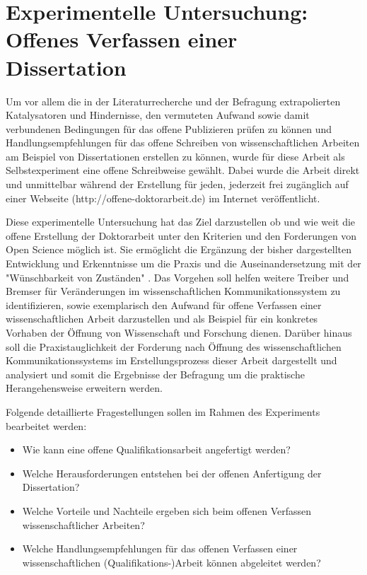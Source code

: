 \chapter{Experimentelle Untersuchung: Offenes Verfassen einer Dissertation}

Um vor allem die in der Literaturrecherche und der Befragung extrapolierten Katalysatoren und Hindernisse, den vermuteten Aufwand sowie damit verbundenen Bedingungen für das offene Publizieren prüfen zu können und Handlungsempfehlungen für das offene Schreiben von wissenschaftlichen Arbeiten am Beispiel von Dissertationen erstellen zu können, wurde für diese Arbeit als Selbstexperiment eine offene Schreibweise gewählt. Dabei wurde die Arbeit direkt und unmittelbar während der Erstellung für jeden, jederzeit frei zugänglich auf einer Webseite (http://offene-doktorarbeit.de) im Internet veröffentlicht.

Diese experimentelle Untersuchung hat das Ziel darzustellen ob und wie weit die offene Erstellung der Doktorarbeit unter den Kriterien und den Forderungen von Open Science möglich ist. Sie ermöglicht die Ergänzung der bisher dargestellten Entwicklung und Erkenntnisse um die Praxis und die Auseinandersetzung mit der "Wünschbarkeit von Zuständen" \cite{cite:10}. Das Vorgehen soll helfen weitere Treiber und Bremser für Veränderungen im wissenschaftlichen Kommunikationssystem zu identifizieren, sowie exemplarisch den Aufwand für offene Verfassen einer wissenschaftlichen Arbeit darzustellen und als Beispiel für ein konkretes Vorhaben der Öffnung von Wissenschaft und Forschung dienen. Darüber hinaus soll die Praxistauglichkeit der Forderung nach Öffnung des wissenschaftlichen Kommunikationssystems im Erstellungsprozess dieser Arbeit dargestellt und analysiert und somit die Ergebnisse der Befragung um die praktische Herangehensweise erweitern werden.

Folgende detaillierte Fragestellungen sollen im Rahmen des Experiments bearbeitet werden:
\begin{itemize}
\item Wie kann eine offene Qualifikationsarbeit angefertigt werden?
\item Welche Herausforderungen entstehen bei der offenen Anfertigung der Dissertation?
\item Welche Vorteile und Nachteile ergeben sich beim offenen Verfassen wissenschaftlicher Arbeiten?
\item Welche Handlungsempfehlungen für das offenen Verfassen einer wissenschaftlichen (Qualifikations-)Arbeit können abgeleitet werden?
\end{itemize}


